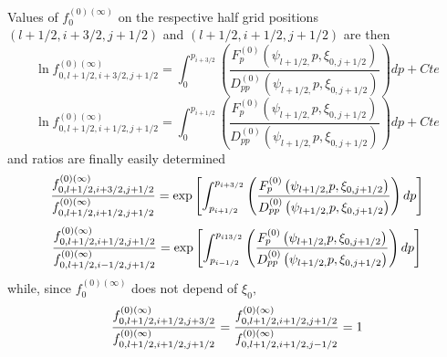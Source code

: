 Values of $f_{0}^{\left( 0\right) (\infty )}$ on the respective half grid
positions $\left( l+1/2,i+3/2,j+1/2\right) $ and $\left(
l+1/2,i+1/2,j+1/2\right) $ are then
\begin{equation}
\ln f_{0,l+1/2,i+3/2,j+1/2}^{\left( 0\right) (\infty
)}=\int_{0}^{p_{i+3/2}}\left( \frac{F_{p}^{\left( 0\right) }\left( \psi
_{l+1/2,}p,\xi _{0,j+1/2}\right) }{D_{pp}^{\left( 0\right) }\left( \psi
_{l+1/2,}p,\xi _{0,j+1/2}\right) }\right) dp+Cte
\end{equation}
\begin{equation}
\ln f_{0,l+1/2,i+1/2,j+1/2}^{\left( 0\right) (\infty
)}=\int_{0}^{p_{i+1/2}}\left( \frac{F_{p}^{\left( 0\right) }\left( \psi
_{l+1/2,}p,\xi _{0,j+1/2}\right) }{D_{pp}^{\left( 0\right) }\left( \psi
_{l+1/2,}p,\xi _{0,j+1/2}\right) }\right) dp+Cte
\end{equation}
and ratios are finally easily determined
\begin{equation}
\frac{f_{0,l+1/2,i+3/2,j+1/2}^{\left( 0\right) (\infty )}}{%
f_{0,l+1/2,i+1/2,j+1/2}^{\left( 0\right) (\infty )}}=\exp \left[
\int_{p_{i+1/2}}^{p_{i+3/2}}\left( \frac{F_{p}^{\left( 0\right) }\left( \psi
_{l+1/2,}p,\xi _{0,j+1/2}\right) }{D_{pp}^{\left( 0\right) }\left( \psi
_{l+1/2,}p,\xi _{0,j+1/2}\right) }\right) dp\right]
\end{equation}
\begin{equation}
\frac{f_{0,l+1/2,i+1/2,j+1/2}^{\left( 0\right) (\infty )}}{%
f_{0,l+1/2,i-1/2,j+1/2}^{\left( 0\right) (\infty )}}=\exp \left[
\int_{p_{i-1/2}}^{p_{i13/2}}\left( \frac{F_{p}^{\left( 0\right) }\left( \psi
_{l+1/2,}p,\xi _{0,j+1/2}\right) }{D_{pp}^{\left( 0\right) }\left( \psi
_{l+1/2,}p,\xi _{0,j+1/2}\right) }\right) dp\right]
\end{equation}
while, since $f_{0}^{\left( 0\right) (\infty )}$ does not depend of $\xi
_{0},$
\begin{equation}
\frac{f_{0,l+1/2,i+1/2,j+3/2}^{\left( 0\right) (\infty )}}{%
f_{0,l+1/2,i+1/2,j+1/2}^{\left( 0\right) (\infty )}}=\frac{%
f_{0,l+1/2,i+1/2,j+1/2}^{\left( 0\right) (\infty )}}{%
f_{0,l+1/2,i+1/2,j-1/2}^{\left( 0\right) (\infty )}}=1
\end{equation}

